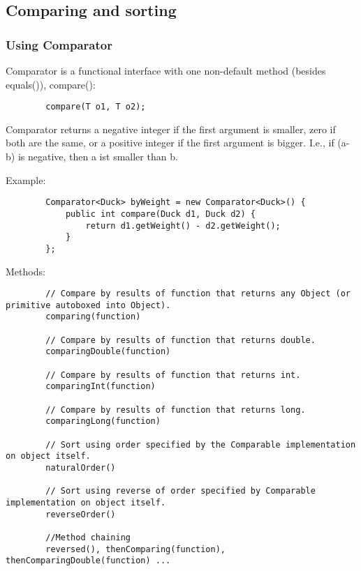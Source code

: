 \documentclass{scrartcl}
\begin{document}
\subsection{Comparing and sorting}

\subsubsection{Using Comparator}

    Comparator is a functional interface with one non-default method (besides equals()), compare():

    \begin{lstlisting}
        compare(T o1, T o2);
    \end{lstlisting}

    Comparator returns a negative integer if the first argument is smaller, zero if both are the same, or a positive integer if the first argument is bigger. I.e., if (a-b) is negative, then a ist smaller than b.

    Example:
    \begin{lstlisting}
        Comparator<Duck> byWeight = new Comparator<Duck>() {
            public int compare(Duck d1, Duck d2) {
                return d1.getWeight() - d2.getWeight();
            }
        };
    \end{lstlisting}

    Methods:

    \begin{lstlisting}
        // Compare by results of function that returns any Object (or primitive autoboxed into Object).
        comparing(function)

        // Compare by results of function that returns double.
        comparingDouble(function)

        // Compare by results of function that returns int.
        comparingInt(function)

        // Compare by results of function that returns long.
        comparingLong(function)

        // Sort using order specified by the Comparable implementation on object itself.
        naturalOrder()

        // Sort using reverse of order specified by Comparable implementation on object itself.
        reverseOrder()

        //Method chaining
        reversed(), thenComparing(function), thenComparingDouble(function) ...

    \end{lstlisting}
\end{document}
